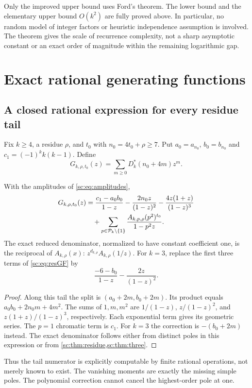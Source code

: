 \documentclass[11pt,a4paper]{article}
\numberwithin{equation}{section}
\theoremstyle{definition}
\theoremstyle{remark}
\begin{document}
Only the improved upper bound uses Ford's theorem. The lower bound and
the elementary upper bound $O(k^2)$ are fully proved above. In particular,
no random model of integer factors or heuristic independence assumption
is involved. The theorem gives the scale of recurrence complexity, not a
sharp asymptotic constant or an exact order of magnitude within the
remaining logarithmic gap.

\section{Exact rational generating functions}\label{sc:sec:gf}

\subsection{A closed rational expression for every residue tail}
Fix $k\ge4$, a residue $\rho$, and $t_0$ with $n_0=4t_0+\rho\ge7$.
Put $a_0=a_{n_0}$, $b_0=b_{n_0}$ and $c_1=(-1)^kk(k-1)$. Define
\[
 G_{k,\rho,t_0}(z)=\sum_{m\ge0}D^*_k(n_0+4m)z^m.
\]

\begin{proposition}\label{sc:prop:residueGF}
With the amplitudes of \eqref{sc:eq:amplitudes},
\begin{align}
 G_{k,\rho,t_0}(z)
 &=\frac{c_1-a_0b_0}{1-z}
   -\frac{2n_0z}{(1-z)^2}
   -\frac{4z(1+z)}{(1-z)^3}\notag\\
 &\quad+\sum_{p\in\mathcal P_k\setminus\{1\}}
       \frac{A_{k,p,\rho}(p^2)^{t_0}}{1-p^2z}.
 \label{sc:eq:resGF}
\end{align}
The exact reduced denominator, normalized to have constant coefficient
one, is the reciprocal of $A_{k,\rho}(x)$:
$z^{d_{k,\rho}}A_{k,\rho}(1/z)$.
For $k=3$, replace the first three terms of \eqref{sc:eq:resGF} by
\[
 \frac{-6-b_0}{1-z}-\frac{2z}{(1-z)^2}.
\]
\end{proposition}
\begin{proof}
Along this tail the split is $(a_0+2m,b_0+2m)$. Its product equals
$a_0b_0+2n_0m+4m^2$. The sums of $1,m,m^2$ are
$1/(1-z)$, $z/(1-z)^2$, and $z(1+z)/(1-z)^3$, respectively.
Each exponential term gives its geometric series. The $p=1$ chromatic
term is $c_1$. For $k=3$ the correction is $-(b_0+2m)$ instead.
The exact denominator follows either from distinct poles in this
expression or from \cref{sc:thm:residue,sc:thm:three}.
\end{proof}

Thus the tail numerator is explicitly computable by finite rational
operations, not merely known to exist. The vanishing moments are exactly
the missing simple poles. The polynomial correction cannot cancel the
highest-order pole at one.
\end{document}
